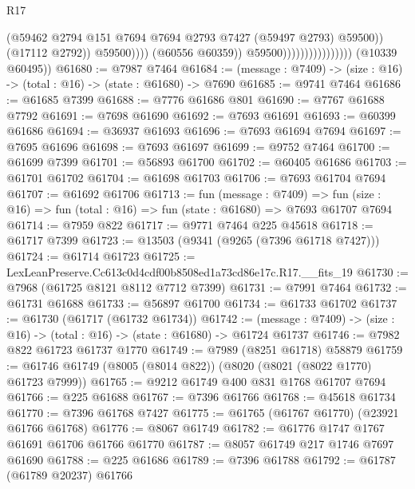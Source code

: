 \begin{lexlean}{R17}
\begin{coremodule}
                                                    (@59462
                                                      @2794
                                                      @151
                                                      @7694
                                                      @7694
                                                      @2793
                                                      @7427
                                                      (@59497 @2793)
                                                      @59500))
                                                  (@17112 @2792))
                                                @59500))))
                                        (@60556 @60359))
                                      @59500))))))))))))))))
      (@10339 @60495))
@61680 := @7987 @7464
@61684 := (message : @7409) -> (size : @16) -> (total : @16) -> (state : @61680) -> @7690
@61685 := @9741 @7464
@61686 := @61685 @7399
@61688 := @7776 @61686 @801
@61690 := @7767 @61688 @7792
@61691 := @7698 @61690
@61692 := @7693 @61691
@61693 := @60399 @61686
@61694 := @36937 @61693
@61696 := @7693 @61694 @7694
@61697 := @7695 @61696
@61698 := @7693 @61697
@61699 := @9752 @7464
@61700 := @61699 @7399
@61701 := @56893 @61700
@61702 := @60405 @61686
@61703 := @61701 @61702
@61704 := @61698 @61703
@61706 := @7693 @61704 @7694
@61707 := @61692 @61706
@61713 := fun (message : @7409) =>
  fun (size : @16) => fun (total : @16) => fun (state : @61680) => @7693 @61707 @7694
@61714 := @7959 @822
@61717 := @9771 @7464 @225 @45618
@61718 := @61717 @7399
@61723 := @13503 (@9341 (@9265 (@7396 @61718 @7427)))
@61724 := @61714 @61723
@61725 := LexLeanPreserve.Cc613c0d4cdf00b8508ed1a73cd86e17c.R17.__fits_19
@61730 := @7968 (@61725 @8121 @8112 @7712 @7399)
@61731 := @7991 @7464
@61732 := @61731 @61688
@61733 := @56897 @61700
@61734 := @61733 @61702
@61737 := @61730 (@61717 (@61732 @61734))
@61742 := (message : @7409) -> (size : @16) -> (total : @16) -> (state : @61680) -> @61724 @61737
@61746 := @7982 @822 @61723 @61737 @1770
@61749 := @7989 (@8251 @61718) @58879
@61759 := @61746 @61749 (@8005 (@8014 @822)) (@8020 (@8021 (@8022 @1770) @61723 @7999))
@61765 := @9212 @61749 @400 @831 @1768 @61707 @7694
@61766 := @225 @61688
@61767 := @7396 @61766
@61768 := @45618 @61734
@61770 := @7396 @61768 @7427
@61775 := @61765 (@61767 @61770) (@23921 @61766 @61768)
@61776 := @8067 @61749
@61782 := @61776 @1747 @1767 @61691 @61706 @61766 @61770
@61787 := @8057 @61749 @217 @1746 @7697 @61690
@61788 := @225 @61686
@61789 := @7396 @61788
@61792 := @61787 (@61789 @20237) @61766

\end{coremodule}
\end{lexlean}
